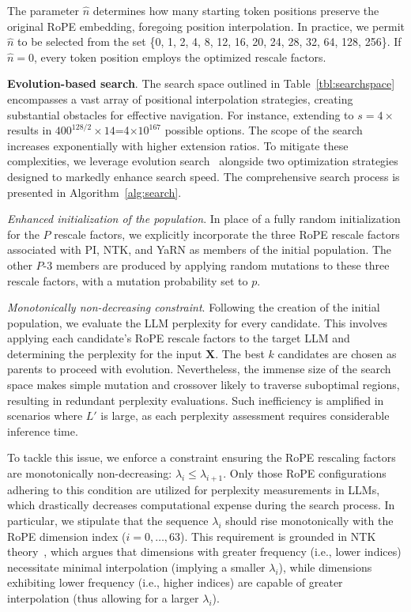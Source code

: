 The parameter $\hat{n}$ determines how many starting token positions preserve the original RoPE embedding, foregoing position interpolation. In practice, we permit $\hat{n}$ to be selected from the set \{0, 1, 2, 4, 8, 12, 16, 20, 24, 28, 32, 64, 128, 256\}. If $\hat{n}=0$, every token position employs the optimized rescale factors.

\textbf{Evolution-based search}. The search space outlined in Table~\ref{tbl:searchspace} encompasses a vast array of positional interpolation strategies, creating substantial obstacles for effective navigation. For instance, extending to $s=4\times$ results in $400^{128/2}\times14$=4$\times10^{167}$ possible options. The scope of the search increases exponentially with higher extension ratios. To mitigate these complexities, we leverage evolution search~\cite{guo2020single} alongside two optimization strategies designed to markedly enhance search speed. The comprehensive search process is presented in Algorithm~\ref{alg:search}.

\textit{Enhanced initialization of the population}. In place of a fully random initialization for the $P$ rescale factors, we explicitly incorporate the three RoPE rescale factors associated with PI, NTK, and YaRN as members of the initial population. The other $P$-3 members are produced by applying random mutations to these three rescale factors, with a mutation probability set to $p$.

\textit{Monotonically non-decreasing constraint}. Following the creation of the initial population, we evaluate the LLM perplexity for every candidate. This involves applying each candidate's RoPE rescale factors to the target LLM and determining the perplexity for the input $\mathbf{X}$. The best $k$ candidates are chosen as parents to proceed with evolution. Nevertheless, the immense size of the search space makes simple mutation and crossover likely to traverse suboptimal regions, resulting in redundant perplexity evaluations. Such inefficiency is amplified in scenarios where $L'$ is large, as each perplexity assessment requires considerable inference time.

To tackle this issue, we enforce a constraint ensuring the RoPE rescaling factors are monotonically non-decreasing: $\lambda_i\le \lambda_{i+1}$. Only those RoPE configurations adhering to this condition are utilized for perplexity measurements in LLMs, which drastically decreases computational expense during the search process. In particular, we stipulate that the sequence $\lambda_i$ should rise monotonically with the RoPE dimension index ($i=0,\ldots,63$). This requirement is grounded in NTK theory~\cite{jacot2018neural,tancik2020fourier,ntk}, which argues that dimensions with greater frequency (i.e., lower indices) necessitate minimal interpolation (implying a smaller $\lambda_i$), while dimensions exhibiting lower frequency (i.e., higher indices) are capable of greater interpolation (thus allowing for a larger $\lambda_i$).


